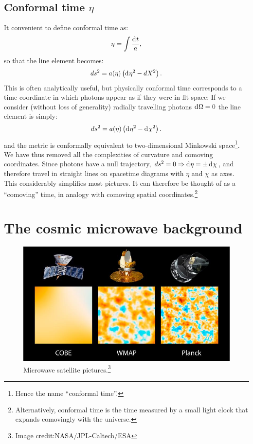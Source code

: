 \subsection{Conformal time $\eta$}

It convenient to define conformal time as:
\begin{equation}
  \eta = \int \frac{\operatorname{d}^{}\!{t}}{a},
  \label{eqn:cos:conformal_time}
\end{equation}
so that the line element becomes:
\begin{equation}          
  ds^2 = a(\eta)\left( \operatorname{d}^{}\!{\eta}^2 - d{X}^2 \right).
  \label{eqn:cos:flat_FRW}
\end{equation}
This is often analytically useful, but physically conformal time corresponds to a time coordinate in which photons appear as if they were in flt space: If we consider (without loss of generality) radially travelling photons $\operatorname{d}^{}\!{\Omega}=0$ the line element is simply:
\begin{equation}          
  ds^2 = a(\eta)\left( \operatorname{d}^{}\!{\eta}^2 - \operatorname{d}^{}\!{\chi}^2 \right).
  \label{eqn:cos:flat_FRW_radial}
\end{equation}
and the metric is conformally equivalent to two-dimensional Minkowski space\footnote{Hence the name ``conformal time''.}. We have thus removed all the complexities of curvature and comoving coordinates. Since photons have a null trajectory, $ds^2=0\Rightarrow \operatorname{d}^{}\!{\eta} = \pm \operatorname{d}^{}\!{\chi}$, and therefore  travel in straight lines on spacetime diagrams with $\eta$ and $\chi$ as axes. This considerably simplifies most pictures. It can therefore be thought of as a ``comoving'' time, in analogy with comoving spatial coordinates.\footnote{Alternatively, conformal time is the time measured by a small light clock that expands comovingly with the universe.}

\section{The cosmic microwave background}
\begin{figure}
  \centering
  \includegraphics[width=\textwidth]{chapter_inflationary_cosmology/figures/satellites}
  \caption{Microwave satellite pictures.\protect\footnote{Image credit:NASA/JPL-Caltech/ESA}}\label{fig:cos:satellites}
\end{figure}

